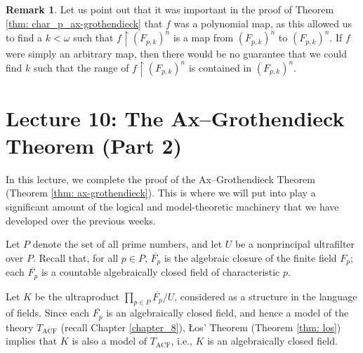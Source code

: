 \documentclass[a4paper]{memoir}
\theoremstyle{definition}
\newtheorem{remark}[theorem]{Remark}
\begin{document}
\begin{remark}
  Let us point out that it was important in the proof of Theorem \ref{thm: char_p_ax-grothendieck} 
  that $f$ was a polynomial map, as this allowed us to find a $k < \omega$ such that 
  $f \restriction (F_{p,k})^n$ is a map from $(F_{p,k})^n$ to $(F_{p,k})^n$. If 
  $f$ were simply an arbitrary map, then there would be no guarantee that we could find 
  $k$ such that the range of $f \restriction (F_{p,k})^n$ is contained in 
  $(F_{p,k})^n$.
\end{remark}

\chapter{Lecture 10: The Ax--Grothendieck Theorem (Part 2)}

In this lecture, we complete the proof of the Ax--Grothendieck Theorem 
(Theorem \ref{thm: ax-grothendieck}). This is where we will put into play a 
significant amount of the logical and model-theoretic machinery that we have 
developed over the previous weeks.

Let $P$ denote the set of all prime numbers, and let $U$ be a nonprincipal ultrafilter 
over $P$. Recall that, for all $p \in P$, $\overline{F_p}$ is the algebraic closure of 
the finite field $F_p$; each $\overline{F_p}$ is a countable algebraically closed field 
of characteristic $p$.

Let $K$ be the ultraproduct $\prod_{p \in P} \overline{F_p}/U$, considered as a structure 
in the language of fields. Since each $\overline{F_p}$ is an algebraically closed field, 
and hence a model of the theory $T_{\mathrm{ACF}}$ (recall Chapter \ref{chapter_8}), 
\L os' Theorem (Theorem \ref{thm: los}) implies that $K$ is also a model of 
$T_{\mathrm{ACF}}$, i.e., $K$ is an algebraically closed field.
\end{document}
